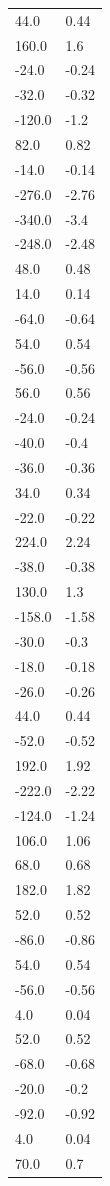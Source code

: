 \begin{longtable}{ll}
44.0 & 0.44 \\
160.0 & 1.6 \\
-24.0 & -0.24 \\
-32.0 & -0.32 \\
-120.0 & -1.2 \\
82.0 & 0.82 \\
-14.0 & -0.14 \\
-276.0 & -2.76 \\
-340.0 & -3.4 \\
-248.0 & -2.48 \\
48.0 & 0.48 \\
14.0 & 0.14 \\
-64.0 & -0.64 \\
54.0 & 0.54 \\
-56.0 & -0.56 \\
56.0 & 0.56 \\
-24.0 & -0.24 \\
-40.0 & -0.4 \\
-36.0 & -0.36 \\
34.0 & 0.34 \\
-22.0 & -0.22 \\
224.0 & 2.24 \\
-38.0 & -0.38 \\
130.0 & 1.3 \\
-158.0 & -1.58 \\
-30.0 & -0.3 \\
-18.0 & -0.18 \\
-26.0 & -0.26 \\
44.0 & 0.44 \\
-52.0 & -0.52 \\
192.0 & 1.92 \\
-222.0 & -2.22 \\
-124.0 & -1.24 \\
106.0 & 1.06 \\
68.0 & 0.68 \\
182.0 & 1.82 \\
52.0 & 0.52 \\
-86.0 & -0.86 \\
54.0 & 0.54 \\
-56.0 & -0.56 \\
4.0 & 0.04 \\
52.0 & 0.52 \\
-68.0 & -0.68 \\
-20.0 & -0.2 \\
-92.0 & -0.92 \\
4.0 & 0.04 \\
70.0 & 0.7 \\

\end{longtable}
